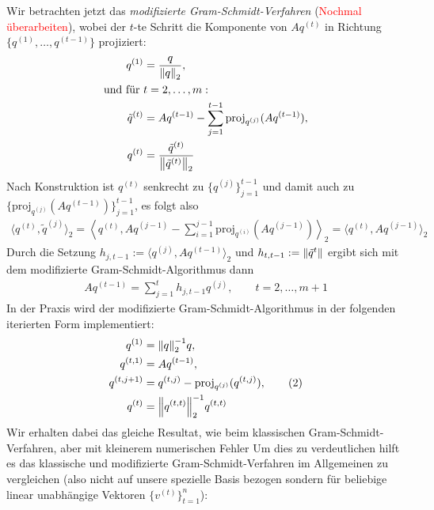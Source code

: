 Wir betrachten jetzt das \textit{modifizierte Gram-Schmidt-Verfahren} (\textcolor{red}{Nochmal überarbeiten}), 
wobei der $t$-te Schritt die Komponente von $Aq^{(t)}$ in Richtung $\{q^{(1)},\dots,q^{(t-1)}\}$ projiziert:
%
\begin{align*}
  q^{(1)} 
  &= \dfrac{q}{\vertn{2}{q}_2},\\
  \text{und für } &t=2,\dots,m: \\
  \tilde{q}^{(t)} 
  &= Aq^{(t-1)} - \sum_{j=1}^{t-1} \text{proj}_{q^{(j)}}(Aq^{(t-1)}), \\
  q^{(t)} &
  = \dfrac{\tilde{q}^{(t)}}{\vertn{2}{\tilde{q}^{(t)}}_2}
\end{align*}
%
Nach Konstruktion ist $q^{(t)}$ senkrecht zu $\{q^{(j)}\}_{j=1}^{t-1}$ und damit auch zu 
$\{\text{proj}_{q^{(j)}}(Aq^{(t-1)})\}_{j=1}^{t-1}$, es folgt also
% 
\begin{align*}
  \langle q^{(t)}, \tilde{q}^{(j)}\rangle_2 
  = \left\langle q^{(t)}, Aq^{(j-1)} - \sum_{i=1}^{j-1} \text{proj}_{q^{(i)}}(Aq^{(j-1)})\right\rangle _2 
  = \langle q^{(t)}, Aq^{(j-1)}\rangle_2
\end{align*}
%
Durch die Setzung $h_{j,t-1} := \langle q^{(j)},Aq^{(t-1)} \rangle_2$ und $h_{t,t-1}:=\vertn{2}{\tilde{q}^{t}}$ 
ergibt sich mit dem modifizierte Gram-Schmidt-Algorithmus dann
%
\begin{align*}
  Aq^{(t-1)}
  =\sum_{j=1}^{t} h_{j,t-1 }q^{(j)}, 
  \qquad t=2,\dots,m+1
  \tag{1}\label{eq:arnoldiEQ1}
\end{align*}
%
In der Praxis wird der modifizierte Gram-Schmidt-Algorithmus in der folgenden iterierten Form implementiert:
%
\begin{align*}
  q^{(1)} &= \vertn{2}{q}_2^{-1}q, \\
  q^{(t,1)} &= Aq^{(t-1)}, \\
  q^{(t,j+1)} &= q^{(t,j)}-\text{proj}_{q^{(j)}}(q^{(t,j)}), 
  \tag{2}\label{eq:arnoldiEQ2}\\
  q^{(t)} &= \vertn{2}{q^{(t,t)}}_2^{-1}q^{(t,t)}
\end{align*}
%
Wir erhalten dabei das gleiche Resultat, wie beim klassischen Gram-Schmidt-Verfahren, 
aber mit kleinerem numerischen Fehler Um dies zu verdeutlichen hilft es 
das klassische und modifizierte Gram-Schmidt-Verfahren im Allgemeinen zu vergleichen 
(also nicht auf unsere spezielle Basis bezogen sondern für beliebige linear unabhängige Vektoren $\{v^{(t)}\}_{t=1}^n$):

